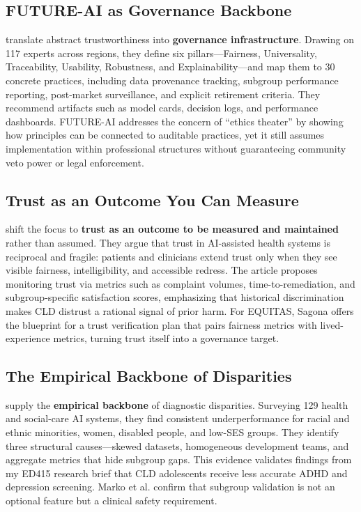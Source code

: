 \documentclass[12pt, letterpaper]{article}
\begin{document}
\subsection{FUTURE-AI as Governance Backbone}
\cite{lekadir2025} translate abstract trustworthiness into \textbf{governance infrastructure}. Drawing on 117 experts across regions, they define six pillars—Fairness, Universality, Traceability, Usability, Robustness, and Explainability—and map them to 30 concrete practices, including data provenance tracking, subgroup performance reporting, post-market surveillance, and explicit retirement criteria. They recommend artifacts such as model cards, decision logs, and performance dashboards. FUTURE-AI addresses the concern of ``ethics theater'' by showing how principles can be connected to auditable practices, yet it still assumes implementation within professional structures without guaranteeing community veto power or legal enforcement.

\subsection{Trust as an Outcome You Can Measure}
\cite{sagona2025} shift the focus to \textbf{trust as an outcome to be measured and maintained} rather than assumed. They argue that trust in AI-assisted health systems is reciprocal and fragile: patients and clinicians extend trust only when they see visible fairness, intelligibility, and accessible redress. The article proposes monitoring trust via metrics such as complaint volumes, time-to-remediation, and subgroup-specific satisfaction scores, emphasizing that historical discrimination makes CLD distrust a rational signal of prior harm. For EQUITAS, Sagona offers the blueprint for a trust verification plan that pairs fairness metrics with lived-experience metrics, turning trust itself into a governance target.

\subsection{The Empirical Backbone of Disparities}
\cite{marko2025} supply the \textbf{empirical backbone} of diagnostic disparities. Surveying 129 health and social-care AI systems, they find consistent underperformance for racial and ethnic minorities, women, disabled people, and low-SES groups. They identify three structural causes—skewed datasets, homogeneous development teams, and aggregate metrics that hide subgroup gaps. This evidence validates findings from my ED415 research brief that CLD adolescents receive less accurate ADHD and depression screening. Marko et al. confirm that subgroup validation is not an optional feature but a clinical safety requirement.
\end{document}
